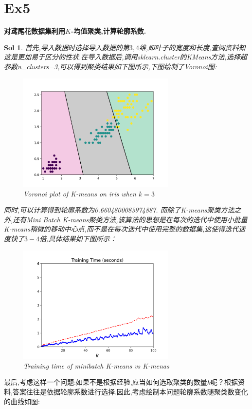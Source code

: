 \documentclass[UTF8,a4paper,11pt]{ctexart}
\newtheorem{sol}{Sol}[section]
\begin{document}
\section{Ex5}
\textbf{对鸢尾花数据集利用$K$-均值聚类,计算轮廓系数.}
\begin{sol}
	首先,导入数据时选择导入数据的第$3,4$维,即叶子的宽度和长度,查阅资料知这是更加易于区分的性状.在导入数据后,调用sklearn.cluster的KMeans方法,选择超参数n\_clusters=3,可以得到聚类结果如下图所示,下图绘制了Voronoi图:
	\begin{figure}[H]
		\centering
		\includegraphics[width=0.7\textwidth,height=0.5\textwidth]{kmeans_v.png}
		\caption{Voronoi plot of K-means on iris when $k=3$}
	\end{figure}
	同时,可以计算得到轮廓系数为0.6604800083974887.
	而除了K-means聚类方法之外,还有Mini Batch K-means聚类方法,该算法的思想是在每次的迭代中使用小批量K-means稍微的移动中心点,而不是在每次迭代中使用完整的数据集,这使得迭代速度快了$3-4$倍,具体结果如下图所示：
	\begin{figure}[H]
		\centering
		\includegraphics[width=0.7\textwidth,height=0.5\textwidth]{time.png}
		\caption{Training time of minibatch K-means vs K-menas}
	\end{figure}
\end{sol}
最后,考虑这样一个问题:如果不是根据经验,应当如何选取聚类的数量$k$呢？根据资料,答案往往是依据轮廓系数进行选择.因此,考虑绘制本问题轮廓系数随聚类数变化的曲线如图:
\end{document}
